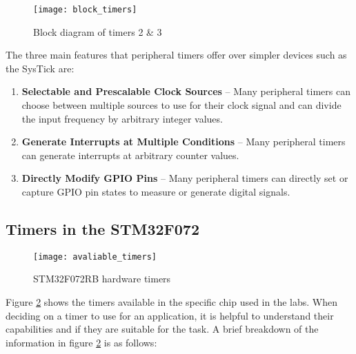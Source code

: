 \documentclass[11pt,fleqn]{book} %
\begin{document}
        \begin{figure}[]
            \centering\texttt{[image: block\_timers]}
            \caption{Block diagram of timers 2 \& 3}
            \label{block_timers}
        \end{figure}
        
        The three main features that peripheral timers offer over simpler devices such as the SysTick are:
        \begin{enumerate}
            \item \textbf{Selectable and Prescalable Clock Sources} -- Many peripheral timers can choose between multiple sources to use for their clock signal and can divide the input frequency by arbitrary integer values. 
            \item \textbf{Generate Interrupts at Multiple Conditions} -- Many peripheral timers can generate interrupts at arbitrary counter values.
            \item \textbf{Directly Modify GPIO Pins} -- Many peripheral timers can directly set or capture GPIO pin states to measure or generate digital signals.  
        \end{enumerate}
        
	
    
    \subsection{Timers in the STM32F072}
        \begin{figure}[]
            \centering\texttt{[image: avaliable\_timers]}
            \caption{STM32F072RB hardware timers}
            \label{avaliable_timers}
        \end{figure}
        
        
        Figure \ref{avaliable_timers} shows the timers available in the specific chip used in the labs. When deciding on a timer to use for an application, it is helpful to understand their capabilities and if they are suitable for the task. A brief breakdown of the information in figure \ref{avaliable_timers} is as follows:
        
\end{document}
